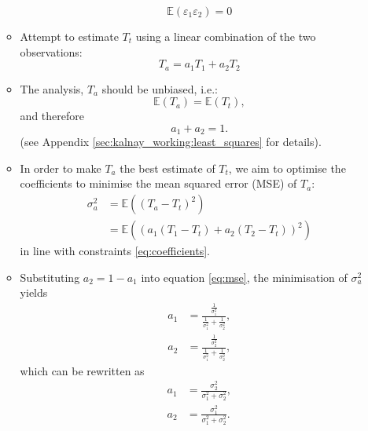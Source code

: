 \begin{itemize}
\begin{itemize}
        \begin{equation}
            \mathbb{E}(\varepsilon_1 \varepsilon_2) = 0
        \end{equation}
        \item Attempt to estimate $T_t$ using a linear combination of the two observations:
        \begin{equation}
            T_a = a_1 T_1 + a_2 T_2
        \end{equation}
        \item The analysis, $T_a$ should be unbiased, i.e.:
        \begin{equation}
            \mathbb{E}(T_a) = \mathbb{E}(T_t),
        \end{equation}
        and therefore
        \begin{equation}
            a_1 + a_2 = 1. \label{eq:coefficients}
        \end{equation}
        (see Appendix \ref{sec:kalnay_working:least_squares} for details).
        \item In order to make $T_a$ the best estimate of $T_t$, we aim to optimise the coefficients to minimise the mean squared error (MSE) of $T_a$:
        \begin{align}
            \sigma_a^2 &= \mathbb{E} \left( \left( T_a - T_t \right)^2 \right) \nonumber \\
                        &= \mathbb{E} \left( \left( a_1(T_1 - T_t) + a_2(T_2 - T_t) \right)^2 \right) \label{eq:mse}
        \end{align}
        in line with constraints \ref{eq:coefficients}.
        \item Substituting $a_2 = 1 - a_1$ into equation \ref{eq:mse}, the minimisation of $\sigma_a^2$ yields
        \begin{subequations}
            \begin{align}
            a_1 &= \frac{\frac{1}{\sigma_1^2}}{\frac{1}{\sigma_1^2} + \frac{1}{\sigma_2^2}}, \\
            a_2 &= \frac{\frac{1}{\sigma_2^2}}{\frac{1}{\sigma_1^2} + \frac{1}{\sigma_2^2}},
            \end{align}
        \end{subequations}
        which can be rewritten as
        \begin{subequations}
            \begin{align}
            a_1 &= \frac{\sigma_2^2}{\sigma_1^2 + \sigma_2^2}, \\
            a_2 &= \frac{\sigma_1^2}{\sigma_1^2 + \sigma_2^2}.

\end{align}
\end{subequations}
\end{itemize}
\end{itemize}
